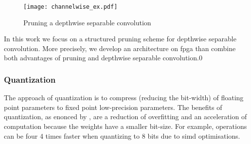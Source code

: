 %
\begin{figure}
    \centering
    \texttt{[image: channelwise\_ex.pdf]}
    \caption{Pruning a depthwise separable convolution \cite{tu_pruning_2019}}
    \label{fig:pruning_dsc}
\end{figure}

In this work we focus on a structured pruning scheme for depthwise separable convolution. More precisely, we develop an architecture on \acrshort{fpga} than combine both advantages of pruning and depthwise separable convolution.0
%
%
\subsubsection{Quantization} \label{subs:quantization}
The approach of quantization is to compress (reducing the bit-width) of floating point parameters to fixed point low-precision parameters. The benefits of quantization, as enonced by \cite{joos_de_ter_beerst_accelerating_2019}, are a reduction of overfitting and an acceleration of computation because the weights have a smaller bit-size. For example, operations can be four 4 times faster when quantizing to 8 bits due to \acrshort{simd} optimisations.

